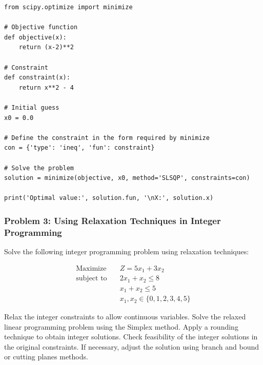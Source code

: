 \documentclass[12pt]{book} %
\begin{document}
\FloatBarrier

\begin{lstlisting}
from scipy.optimize import minimize

# Objective function
def objective(x):
    return (x-2)**2

# Constraint
def constraint(x):
    return x**2 - 4

# Initial guess
x0 = 0.0

# Define the constraint in the form required by minimize
con = {'type': 'ineq', 'fun': constraint}

# Solve the problem
solution = minimize(objective, x0, method='SLSQP', constraints=con)

print('Optimal value:', solution.fun, '\nX:', solution.x)
\end{lstlisting}

\FloatBarrier

\subsubsection*{Problem 3: Using Relaxation Techniques in Integer Programming}
Solve the following integer programming problem using relaxation techniques:

\begin{align*}
\text{Maximize} \quad & Z = 5x_1 + 3x_2 \\
\text{subject to} \quad & 2x_1 + x_2 \leq 8 \\
& x_1 + x_2 \leq 5 \\
& x_1, x_2 \in \{0, 1, 2, 3, 4, 5\}
\end{align*}

\begin{algorithm}
\caption{Integer Programming Relaxation}
\begin{algorithmic}[1]
\State Relax the integer constraints to allow continuous variables.
\State Solve the relaxed linear programming problem using the Simplex method.
\State Apply a rounding technique to obtain integer solutions.
\State Check feasibility of the integer solutions in the original constraints.
\State If necessary, adjust the solution using branch and bound or cutting planes methods.
\end{algorithmic}
\end{algorithm}

\FloatBarrier
\end{document}
